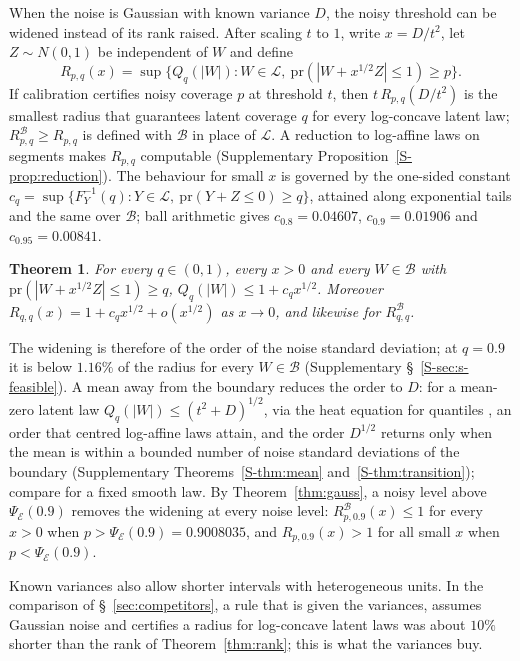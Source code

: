\documentclass[12pt]{article}
\newtheorem{theorem}{Theorem}
\theoremstyle{definition}
\newcommand{\pr}{\mathrm{pr}}
\newcommand{\LC}{\mathcal{L}}
\newcommand{\B}{\mathcal{B}}
\newcommand{\E}{\mathcal{E}}
\begin{document}
When the noise is Gaussian with known variance $D$, the noisy threshold can be widened instead of its rank raised. After scaling $t$ to $1$, write $x = D/t^2$, let $Z \sim N(0,1)$ be independent of $W$ and define
\begin{equation}\label{eq:R}
R_{p,q}(x) = \sup\{ Q_q(|W|) : W \in \LC,\ \pr(|W + x^{1/2}Z| \le 1) \ge p \}.
\end{equation}
If calibration certifies noisy coverage $p$ at threshold $t$, then $t\,R_{p,q}(D/t^2)$ is the smallest radius that guarantees latent coverage $q$ for every log-concave latent law; $R^{\B}_{p,q} \ge R_{p,q}$ is defined with $\B$ in place of $\LC$. A reduction to log-affine laws on segments makes $R_{p,q}$ computable (Supplementary Proposition~\ref{S-prop:reduction}). The behaviour for small $x$ is governed by the one-sided constant $c_q = \sup\{F_Y^{-1}(q) : Y \in \LC,\ \pr(Y + Z \le 0) \ge q\}$, attained along exponential tails and the same over $\B$; ball arithmetic gives $c_{0.8} = 0.04607$, $c_{0.9} = 0.01906$ and $c_{0.95} = 0.00841$.

\begin{theorem}\label{thm:small}
For every $q \in (0,1)$, every $x > 0$ and every $W \in \B$ with $\pr(|W + x^{1/2}Z| \le 1) \ge q$, $Q_q(|W|) \le 1 + c_q x^{1/2}$. Moreover $R_{q,q}(x) = 1 + c_q x^{1/2} + o(x^{1/2})$ as $x \to 0$, and likewise for $R^{\B}_{q,q}$.
\end{theorem}

The widening is therefore of the order of the noise standard deviation; at $q = 0.9$ it is below $1.16\%$ of the radius for every $W \in \B$ (Supplementary \S~\ref{S-sec:s-feasible}). A mean away from the boundary reduces the order to $D$: for a mean-zero latent law $Q_q(|W|) \le (t^2 + D)^{1/2}$, via the heat equation for quantiles \citep{steinbrecher2008}, an order that centred log-affine laws attain, and the order $D^{1/2}$ returns only when the mean is within a bounded number of noise standard deviations of the boundary (Supplementary Theorems~\ref{S-thm:mean} and~\ref{S-thm:transition}); compare \citet{jochmans2024} for a fixed smooth law. By Theorem~\ref{thm:gauss}, a noisy level above $\Psi_{\E}(0.9)$ removes the widening at every noise level: $R^{\B}_{p,0.9}(x) \le 1$ for every $x > 0$ when $p > \Psi_{\E}(0.9) = 0.9008035$, and $R_{p,0.9}(x) > 1$ for all small $x$ when $p < \Psi_{\E}(0.9)$.

Known variances also allow shorter intervals with heterogeneous units. In the comparison of \S~\ref{sec:competitors}, a rule that is given the variances, assumes Gaussian noise and certifies a radius for log-concave latent laws was about $10\%$ shorter than the rank of Theorem~\ref{thm:rank}; this is what the variances buy.
\end{document}
